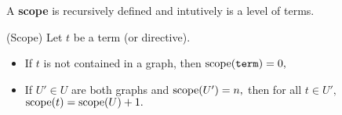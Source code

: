 \begin{itemize}
A \textbf{scope} is recursively defined and intutively is a level of terms.
\begin{definition} (Scope)
 Let $t$ be a term (or directive).
  \begin{itemize}
	\item If $t$ is not contained in a graph, then $\textrm{scope}(\texttt{term}) = 0,$
    \item If $U' \in U$ are both graphs and $\textrm{scope}(U') = n,$ then for all $t \in U',$ $\textrm{scope}(t) = \textrm{scope}(U) + 1.$
  \end{itemize}
\end{definition}


\end{itemize}
